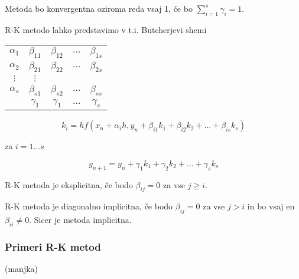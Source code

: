 \documentclass[a4paper,12pt]{article}
\theoremstyle{definition}
\theoremstyle{remark}
\newcounter{subsubsubsection}[subsubsection]
\begin{document}
Metoda bo konvergentna oziroma reda vsaj 1, če bo $\sum_{i=1}^{s} \gamma_i = 1$.

R-K metodo lahko predstavimo v t.i. Butcherjevi shemi

\begin{center}
    \begin{tabular}{ c|c c c c }
        $\alpha_1$ & $\beta_{11}$ & $\beta_{12}$ & $\dots$ & $\beta_{1s}$ \\
        $\alpha_2$ & $\beta_{21}$ & $\beta_{22}$ & $\dots$ & $\beta_{2s}$ \\
        $\vdots$ & $\vdots$ \\
        $\alpha_s$ & $\beta_{s1}$ & $\beta_{s2}$ & $\dots$ & $\beta_{ss}$ \\
        \hline
        & $\gamma_1$ & $\gamma_1$ & $\dots$ & $\gamma_s$
    \end{tabular}
\end{center}


\begin{equation*}
    k_i = h f(x_n + \alpha_i h, y_n + \beta_{i1}k_1 + \beta_{i2}k_2 + \dots + \beta_{is}k_s)
\end{equation*}

za $i = 1 \dots s$

\begin{equation*}
    y_{n+1} = y_n + \gamma_1 k_1 + \gamma_2 k_2 + \dots + \gamma_s k_s
\end{equation*}

R-K metoda je eksplicitna, če bodo $\beta_{ij} = 0$ za vse $j \geq i$.

R-K metoda je diagonalno implicitna, če bodo $\beta_{ij} = 0$ za vse $j > i$ in bo vsaj en $\beta_{ii} \neq 0$. Sicer je metoda implicitna.

\subsubsection{Primeri R-K metod}
(manjka)
%

\end{document}
